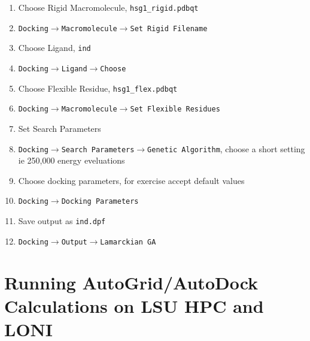 \documentclass[slidestop,mathserif,compress,xcolor=svgnames]{beamer}
\newenvironment{eblock}[0]
{
\begin{beamerboxesrounded}[upper=uppercol2,lower=lowercol2,shadow=true]}
{\end{beamerboxesrounded}}
\begin{document}
\begin{frame}[allowframebreaks]
  \begin{eblock}{}
    \begin{enumerate}
      \item Choose Rigid Macromolecule, \texttt{hsg1\_rigid.pdbqt}
      \item[] \texttt{Docking$\rightarrow$Macromolecule$\rightarrow$Set Rigid Filename}
      \item Choose Ligand, \texttt{ind}
      \item[] \texttt{Docking$\rightarrow$Ligand$\rightarrow$Choose}
      \item Choose Flexible Residue, \texttt{hsg1\_flex.pdbqt}
      \item[] \texttt{Docking$\rightarrow$Macromolecule$\rightarrow$Set Flexible Residues}
      \item Set Search Parameters
      \item[] \texttt{Docking$\rightarrow$Search Parameters$\rightarrow$Genetic Algorithm}, choose a short setting ie 250,000 energy eveluations
      \item Choose docking parameters, for exercise accept default values
      \item[] \texttt{Docking$\rightarrow$Docking Parameters}
      \item Save output as \texttt{ind.dpf}
      \item[] \texttt{Docking$\rightarrow$Output$\rightarrow$Lamarckian GA}
    \end{enumerate}
  \end{eblock}
\end{frame}

\section{Running AutoGrid/AutoDock Calculations on LSU HPC and LONI}
\end{document}
